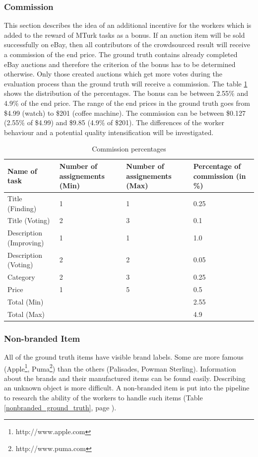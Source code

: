 \subsubsection{Commission}
This section describes the idea of an additional incentive for the workers which is added to the reward of MTurk tasks as a bonus. If an auction item will be sold successfully on eBay, then all contributors of the crowdsourced result will receive a commission of the end price. The ground truth contains already completed eBay auctions and therefore the criterion of the bonus has to be determined otherwise. Only those created auctions which get more votes during the evaluation process than the ground truth will receive a commission. The table \ref{comm_perc} shows the distribution of the percentages. The bonus can be between 2.55\% and 4.9\% of the end price. The range of the end prices in the ground truth goes from \$4.99 (watch) to \$201 (coffee machine). The commission can be between \$0.127 (2.55\% of \$4.99) and \$9.85 (4.9\% of \$201). The differences of the worker behaviour and a potential quality intensification will be investigated. 
\begin{table}[h!]
	\begin{center}
	\begin{tabular}{| p{3.25cm} | p{3.25cm} | p{3.25cm} | p{3.25cm} |}
		\hline
		\textbf{Name of task} & \textbf{Number of assignements (Min)} & \textbf{Number of assignements (Max)} & \textbf{Percentage of commission (in \%)} \\
		\hline
		Title (Finding) & 1 & 1 & 0.25 \\
		\hline
		Title (Voting) & 2 & 3 & 0.1 \\
		\hline
		Description (Improving) & 1 & 1 & 1.0 \\
		\hline
		Description (Voting) & 2 & 2 & 0.05 \\
		\hline
		Category & 2 & 3 & 0.25 \\
		\hline
		Price & 1 & 5 & 0.5 \\
		\hline
		Total (Min) & & & 2.55 \\
		\hline
		Total (Max) & & & 4.9 \\
		\hline
	\end{tabular}
	\end{center}
	\caption{Commission percentages}
	\label{comm_perc}
\end{table}

\subsubsection{Non-branded Item}
All of the ground truth items have visible brand labels. Some are more famous (Apple\footnote{http://www.apple.com}, Puma\footnote{http://www.puma.com}) than the others (Palisades, Powman Sterling). Information about the brands and their manufactured items can be found easily. Describing an unknown object is more difficult. A non-branded item is put into the pipeline to research the ability of the workers to handle such items (Table \ref{nonbranded_ground_truth}, page \pageref{nonbranded_ground_truth}). 

